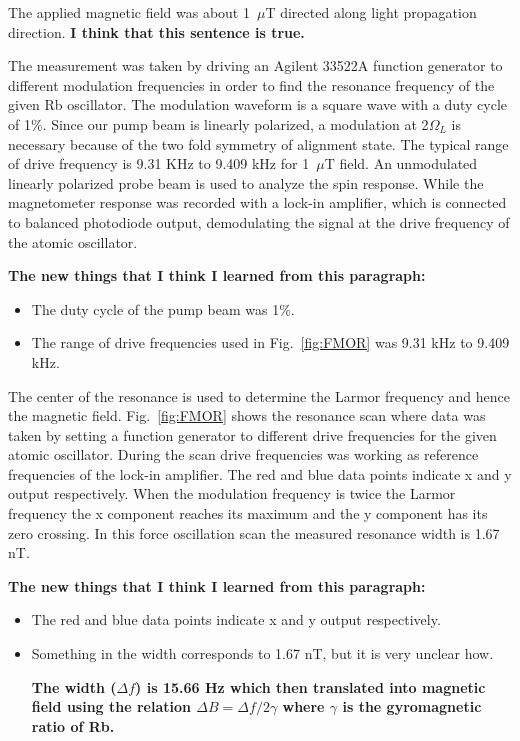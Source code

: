 The applied magnetic field was about 1~$\mu$T directed along light
propagation direction.  {\bf I think that this sentence is true.}

The measurement was taken by driving an Agilent 33522A function
generator to different modulation frequencies in order to find the
resonance frequency of the given Rb oscillator. The modulation
waveform is a square wave with a duty cycle of 1\%. Since our pump
beam is linearly polarized, a modulation at 2$\Omega_{L}$ is necessary
because of the two fold symmetry of alignment state. The typical range
of drive frequency is 9.31 KHz to 9.409 kHz for 1~$\mu$T field. An
unmodulated linearly polarized probe beam is used to analyze the spin
response. While the magnetometer response was recorded with a lock-in
amplifier, which is connected to balanced photodiode output,
demodulating the signal at the drive frequency of the atomic
oscillator.

{\bf The new things that I think I learned from this paragraph:}
\begin{itemize}
\item The duty cycle of the pump beam was 1\%.
\item The range of drive frequencies used in Fig.~\ref{fig:FMOR} was
  9.31 kHz to 9.409 kHz.
\end{itemize}


The center of the resonance is used to determine the Larmor frequency
and hence the magnetic field.  Fig.~\ref{fig:FMOR} shows the resonance
scan where data was taken by setting a function generator to different
drive frequencies for the given atomic oscillator. During the scan
drive frequencies was working as reference frequencies of the lock-in
amplifier. The red and blue data points indicate x and y output
respectively. When the modulation frequency is twice the Larmor
frequency the x component reaches its maximum and the y component has
its zero crossing. In this force oscillation scan the measured
resonance width is 1.67 nT.

{\bf The new things that I think I learned from this paragraph:}
\begin{itemize}
\item The red and blue data points indicate x and y output
respectively.
\item Something in the width corresponds to 1.67 nT, but it is very
  unclear how.
  
  \bf The width ($\Delta f$) is 15.66 Hz which then translated into magnetic field using the relation $\Delta B= \Delta f/2 \gamma$ where $\gamma$ is the gyromagnetic ratio of Rb.
\end{itemize}

